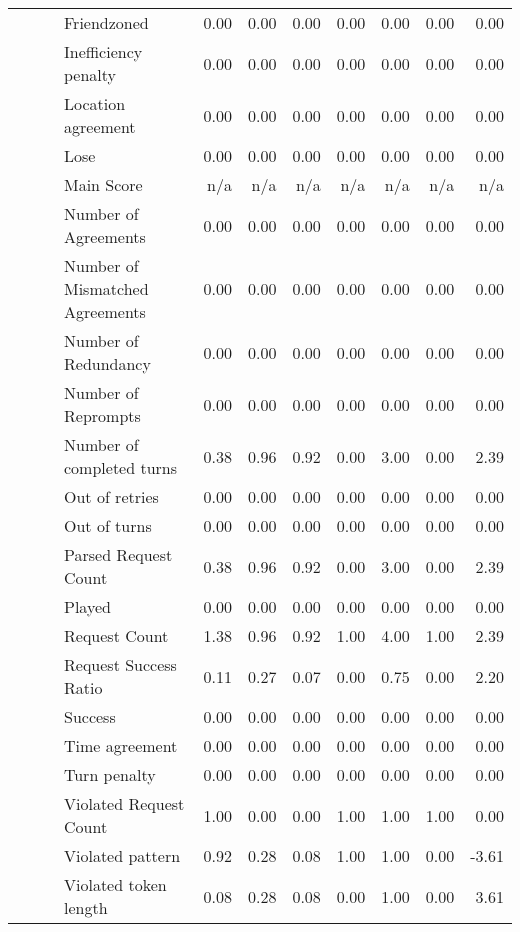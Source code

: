 \begin{tabular}{llllrrrrrrr}
 &  &  & Friendzoned & 0.00 & 0.00 & 0.00 & 0.00 & 0.00 & 0.00 & 0.00 \\
 &  &  & Inefficiency penalty & 0.00 & 0.00 & 0.00 & 0.00 & 0.00 & 0.00 & 0.00 \\
 &  &  & Location agreement & 0.00 & 0.00 & 0.00 & 0.00 & 0.00 & 0.00 & 0.00 \\
 &  &  & Lose & 0.00 & 0.00 & 0.00 & 0.00 & 0.00 & 0.00 & 0.00 \\
 &  &  & Main Score & n/a & n/a & n/a & n/a & n/a & n/a & n/a \\
 &  &  & Number of Agreements & 0.00 & 0.00 & 0.00 & 0.00 & 0.00 & 0.00 & 0.00 \\
 &  &  & Number of Mismatched Agreements & 0.00 & 0.00 & 0.00 & 0.00 & 0.00 & 0.00 & 0.00 \\
 &  &  & Number of Redundancy & 0.00 & 0.00 & 0.00 & 0.00 & 0.00 & 0.00 & 0.00 \\
 &  &  & Number of Reprompts & 0.00 & 0.00 & 0.00 & 0.00 & 0.00 & 0.00 & 0.00 \\
 &  &  & Number of completed turns & 0.38 & 0.96 & 0.92 & 0.00 & 3.00 & 0.00 & 2.39 \\
 &  &  & Out of retries & 0.00 & 0.00 & 0.00 & 0.00 & 0.00 & 0.00 & 0.00 \\
 &  &  & Out of turns & 0.00 & 0.00 & 0.00 & 0.00 & 0.00 & 0.00 & 0.00 \\
 &  &  & Parsed Request Count & 0.38 & 0.96 & 0.92 & 0.00 & 3.00 & 0.00 & 2.39 \\
 &  &  & Played & 0.00 & 0.00 & 0.00 & 0.00 & 0.00 & 0.00 & 0.00 \\
 &  &  & Request Count & 1.38 & 0.96 & 0.92 & 1.00 & 4.00 & 1.00 & 2.39 \\
 &  &  & Request Success Ratio & 0.11 & 0.27 & 0.07 & 0.00 & 0.75 & 0.00 & 2.20 \\
 &  &  & Success & 0.00 & 0.00 & 0.00 & 0.00 & 0.00 & 0.00 & 0.00 \\
 &  &  & Time agreement & 0.00 & 0.00 & 0.00 & 0.00 & 0.00 & 0.00 & 0.00 \\
 &  &  & Turn penalty & 0.00 & 0.00 & 0.00 & 0.00 & 0.00 & 0.00 & 0.00 \\
 &  &  & Violated Request Count & 1.00 & 0.00 & 0.00 & 1.00 & 1.00 & 1.00 & 0.00 \\
 &  &  & Violated pattern & 0.92 & 0.28 & 0.08 & 1.00 & 1.00 & 0.00 & -3.61 \\
 &  &  & Violated token length & 0.08 & 0.28 & 0.08 & 0.00 & 1.00 & 0.00 & 3.61 \\
\cline{3-11}

\end{tabular}
